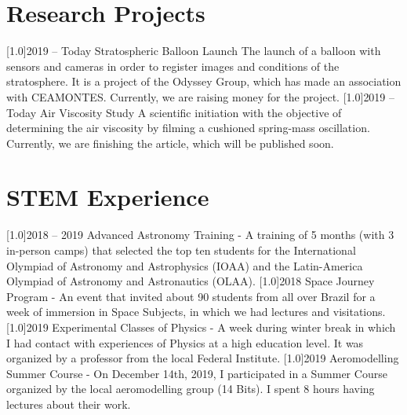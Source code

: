 \documentclass{cv-style}
\begin{document}
\section{Research Projects}
    \vspace{-0.2cm}
    \begin{entrylist}
        \entry
            {\scalebox{.8}[1.0]{2019 -- Today}}
            {Stratospheric Balloon Launch}
            {}
            {The launch of a balloon with sensors and cameras in order to register images and conditions of the stratosphere. It is a project of the Odyssey Group, which has made an association with CEAMONTES. Currently, we are raising money for the project.}
        \entry
            {\scalebox{.8}[1.0]{2019 -- Today}}
            {Air Viscosity Study}
            {}
            {A scientific initiation with the objective of determining the air viscosity by filming a cushioned spring-mass oscillation. Currently, we are finishing the article, which will be published soon.}
\end{entrylist}

\section{STEM Experience}
    \vspace{-0.2cm}
    \begin{entrylist}
        \entry
            {\scalebox{.8}[1.0]{2018 -- 2019}}
            {Advanced Astronomy Training - {}}
            {}
            {A training of 5 months (with 3 in-person camps) that selected the top ten students for the International Olympiad of Astronomy and Astrophysics (IOAA) and the Latin-America Olympiad of Astronomy and Astronautics (OLAA).}
        \entry
            {\scalebox{.8}[1.0]{2018}}
            {Space Journey Program - {}}
            {}
            {An event that invited about 90 students from all over Brazil for a week of immersion in Space Subjects, in which we had lectures and visitations.}
        \entry
            {\scalebox{.8}[1.0]{2019}}
            {Experimental Classes of Physics - {}}
            {}
            {A week during winter break in which I had contact with experiences of Physics at a high education level. It was organized by a professor from the local Federal Institute.}
        \entry
            {\scalebox{.8}[1.0]{2019}}
            {Aeromodelling Summer Course - {}}
            {}
            {On December 14th, 2019, I participated in a Summer Course organized by the local aeromodelling group (14 Bits). I spent 8 hours having lectures about their work.}
    \end{entrylist}
\end{document}
